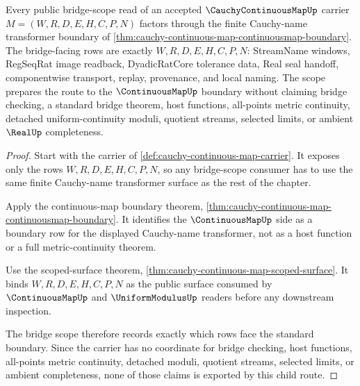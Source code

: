 \begin{theorem}
\label{thm:cauchy-continuous-map-bridge-scope}
Every public bridge-scope read of an accepted $\CauchyContinuousMapUp$ carrier $M=(W,R,D,E,H,C,P,N)$ factors through the finite Cauchy-name transformer boundary of \autoref{thm:cauchy-continuous-map-continuousmap-boundary}. The bridge-facing rows are exactly $W,R,D,E,H,C,P,N$: StreamName windows, RegSeqRat image readback, DyadicRatCore tolerance data, Real seal handoff, componentwise transport, replay, provenance, and local naming. The scope prepares the route to the $\ContinuousMapUp$ boundary without claiming bridge checking, a standard bridge theorem, host functions, all-points metric continuity, detached uniform-continuity moduli, quotient streams, selected limits, or ambient $\RealUp$ completeness.
\end{theorem}
\begin{proof}
Start with the carrier of \autoref{def:cauchy-continuous-map-carrier}. It exposes only the rows $W,R,D,E,H,C,P,N$, so any bridge-scope consumer has to use the same finite Cauchy-name transformer surface as the rest of the chapter.

Apply the continuous-map boundary theorem, \autoref{thm:cauchy-continuous-map-continuousmap-boundary}. It identifies the $\ContinuousMapUp$ side as a boundary row for the displayed Cauchy-name transformer, not as a host function or a full metric-continuity theorem.

Use the scoped-surface theorem, \autoref{thm:cauchy-continuous-map-scoped-surface}. It binds $W,R,D,E,H,C,P,N$ as the public surface consumed by $\ContinuousMapUp$ and $\UniformModulusUp$ readers before any downstream inspection.

The bridge scope therefore records exactly which rows face the standard boundary. Since the carrier has no coordinate for bridge checking, host functions, all-points metric continuity, detached moduli, quotient streams, selected limits, or ambient completeness, none of those claims is exported by this child route.
\end{proof}
